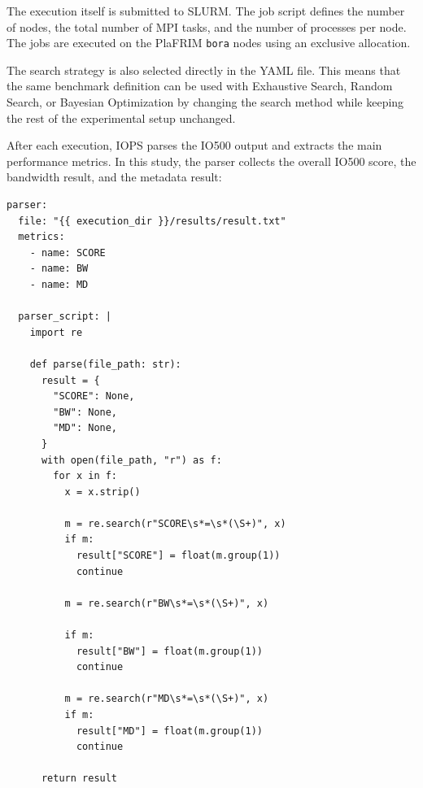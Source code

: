 The execution itself is submitted to SLURM. The job script defines the
number of nodes, the total number of MPI tasks, and the number of
processes per node. The jobs are executed on the PlaFRIM
\texttt{bora} nodes using an exclusive allocation.

The search strategy is also selected directly in the YAML file. This
means that the same benchmark definition can be used with Exhaustive
Search, Random Search, or Bayesian Optimization by changing the search
method while keeping the rest of the experimental setup unchanged.

 After each execution, IOPS parses the IO500 output and extracts the main
performance metrics. In this study, the parser collects the overall
IO500 score, the bandwidth result, and the metadata result:

\begin{verbatim}
parser:
  file: "{{ execution_dir }}/results/result.txt"
  metrics:
    - name: SCORE
    - name: BW
    - name: MD

  parser_script: |
    import re

    def parse(file_path: str):
      result = {
        "SCORE": None,
        "BW": None,
        "MD": None,
      }
      with open(file_path, "r") as f:
        for x in f:
          x = x.strip()

          m = re.search(r"SCORE\s*=\s*(\S+)", x)
          if m:
            result["SCORE"] = float(m.group(1))
            continue

          m = re.search(r"BW\s*=\s*(\S+)", x)

          if m:
            result["BW"] = float(m.group(1))
            continue

          m = re.search(r"MD\s*=\s*(\S+)", x)
          if m:
            result["MD"] = float(m.group(1))
            continue

      return result
\end{verbatim}



